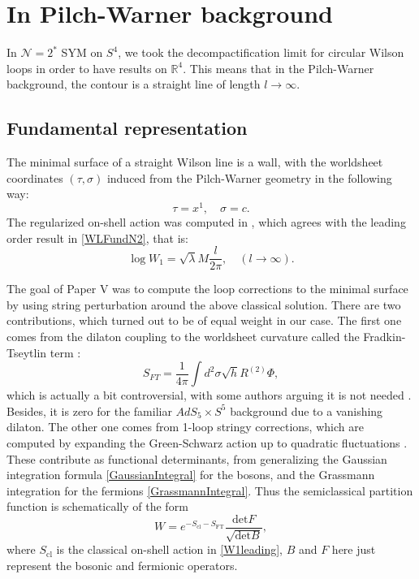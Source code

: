 \section{In Pilch-Warner background}

In $\mathcal{N}=2^*$ SYM on $S^4$, we took the decompactification limit for circular Wilson loops in order to have results on $\mathbb{R}^4$.
This means that in the Pilch-Warner background, the contour is a straight line of length $l\rightarrow \infty$. 

\subsection{Fundamental representation}
The minimal surface of a straight Wilson line is a wall,
with the worldsheet coordinates $(\tau, \sigma)$ induced from the Pilch-Warner geometry in the following way:
\begin{equation}
 \tau = x^1, \quad \sigma = c.
\end{equation}
The regularized on-shell action was computed in \cite{Buchel:2013id}, 
which agrees with the leading order result in \eqref{WLFundN2}, that is:
\begin{equation}\label{W1leading}
 \log W_1 = \sqrt{\lambda} M \frac{l}{2\pi }, \quad (l\rightarrow \infty).
\end{equation}


The goal of Paper V was to compute the loop corrections to the minimal surface 
by using string perturbation around the above classical solution.
There are two contributions, which turned out to be of equal weight in our case. 
The first one comes from the dilaton coupling to the worldsheet curvature called the Fradkin-Tseytlin term \cite{Fradkin:1983xs}:
\begin{equation}
 S_{FT}=\dfrac{1}{4\pi} \int d^2\sigma \sqrt{h}  R^{(2)} \Phi,
\end{equation}
which is actually a bit controversial, 
with some authors arguing it is not needed \cite{GRISARU1988625, GRISARU1985116, Cvetic:1999zs}.
Besides, it is zero for the familiar $AdS_5 \times S^5$ background due to a vanishing dilaton. 
The other one comes from 1-loop stringy corrections, 
which are computed by expanding the Green-Schwarz action up to quadratic fluctuations \cite{Cvetic:1999zs}.
These contribute as functional determinants, from generalizing the Gaussian integration formula \eqref{GaussianIntegral} for the bosons,
and the Grassmann integration for the fermions \eqref{GrassmannIntegral}.
Thus the semiclassical partition function is schematically of the form
\begin{equation}
 W = e^{-S_\text{cl}-S_\text{FT}} \dfrac{\text{det} F}{\sqrt{\text{det} B}},
\end{equation}
where $S_\text{cl}$ is the classical on-shell action in \eqref{W1leading}, 
$B$ and $F$ here just represent the bosonic and fermionic operators.


